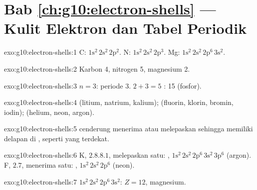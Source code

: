 \section*{Bab \ref{ch:g10:electron-shells} --- Kulit Elektron dan Tabel Periodik}

\begin{solution}{exo:g10:electron-shells:1}
C: $1\mathrm{s}^2\,2\mathrm{s}^2\,2\mathrm{p}^2$. N:
$1\mathrm{s}^2\,2\mathrm{s}^2\,2\mathrm{p}^3$. Mg:
$1\mathrm{s}^2\,2\mathrm{s}^2\,2\mathrm{p}^6\,3\mathrm{s}^2$.
\end{solution}

\begin{solution}{exo:g10:electron-shells:2}
Karbon 4, nitrogen 5, magnesium 2.
\end{solution}

\begin{solution}{exo:g10:electron-shells:3}
 $n = 3$: periode 3. $2 + 3 = 5$ : 
15 (fosfor).
\end{solution}

\begin{solution}{exo:g10:electron-shells:4}
 (litium, natrium, kalium);  (fluorin, klorin,
bromin, iodin);  (helium, neon, argon).
\end{solution}

\begin{solution}{exo:g10:electron-shells:5}
 cenderung menerima atau melepaskan  sehingga memiliki
delapan  di , seperti  yang terdekat.
\end{solution}

\begin{solution}{exo:g10:electron-shells:6}
K, $2.8.8.1$, melepaskan satu: ,
$1\mathrm{s}^2\,2\mathrm{s}^2\,2\mathrm{p}^6\,3\mathrm{s}^2\,3\mathrm{p}^6$
(argon). F, $2.7$, menerima satu: ,
$1\mathrm{s}^2\,2\mathrm{s}^2\,2\mathrm{p}^6$ (neon).
\end{solution}

\begin{solution}{exo:g10:electron-shells:7}
$1\mathrm{s}^2\,2\mathrm{s}^2\,2\mathrm{p}^6\,3\mathrm{s}^2$: $Z = 12$,
magnesium.
\end{solution}

